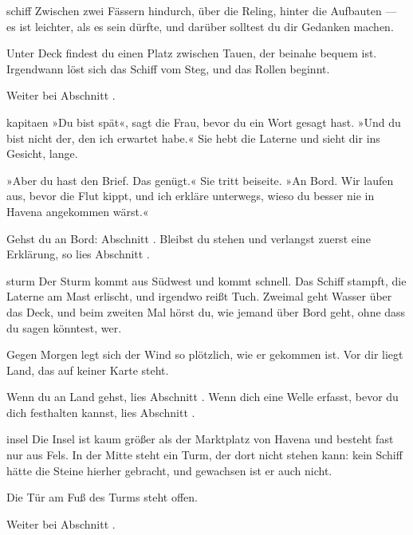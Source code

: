 \begin{soloBlock}{schiff}
Zwischen zwei Fässern hindurch, über die Reling, hinter die Aufbauten — es ist
leichter, als es sein dürfte, und darüber solltest du dir Gedanken machen.

Unter Deck findest du einen Platz zwischen Tauen, der beinahe bequem ist. Irgendwann
löst sich das Schiff vom Steg, und das Rollen beginnt.

Weiter bei Abschnitt .
\end{soloBlock}

\begin{soloBlock}{kapitaen}
»Du bist spät«, sagt die Frau, bevor du ein Wort gesagt hast. »Und du bist nicht der,
den ich erwartet habe.« Sie hebt die Laterne und sieht dir ins Gesicht, lange.

»Aber du hast den Brief. Das genügt.« Sie tritt beiseite. »An Bord. Wir laufen aus,
bevor die Flut kippt, und ich erkläre unterwegs, wieso du besser nie in Havena
angekommen wärst.«

Gehst du an Bord: Abschnitt . Bleibst du stehen und verlangst
zuerst eine Erklärung, so lies Abschnitt .
\end{soloBlock}

\begin{soloBlock}{sturm}
Der Sturm kommt aus Südwest und kommt schnell. Das Schiff stampft, die Laterne am
Mast erlischt, und irgendwo reißt Tuch. Zweimal geht Wasser über das Deck, und beim
zweiten Mal hörst du, wie jemand über Bord geht, ohne dass du sagen könntest, wer.

Gegen Morgen legt sich der Wind so plötzlich, wie er gekommen ist. Vor dir liegt
Land, das auf keiner Karte steht.

Wenn du an Land gehst, lies Abschnitt . Wenn dich eine Welle
erfasst, bevor du dich festhalten kannst, lies Abschnitt .
\end{soloBlock}

\begin{soloBlock}{insel}
Die Insel ist kaum größer als der Marktplatz von Havena und besteht fast nur aus
Fels. In der Mitte steht ein Turm, der dort nicht stehen kann: kein Schiff hätte
die Steine hierher gebracht, und gewachsen ist er auch nicht.

Die Tür am Fuß des Turms steht offen.

Weiter bei Abschnitt .
\end{soloBlock}

